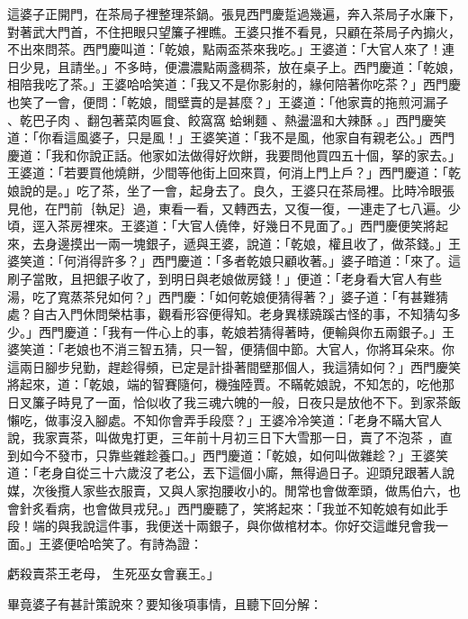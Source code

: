 這婆子正開門，在茶局子裡整理茶鍋。張見西門慶踅過幾遍，奔入茶局子水廉下，對著武大門首，不住把眼只望簾子裡瞧。王婆只推不看見，只顧在茶局子內搧火，不出來問茶。西門慶叫道：「乾娘，點兩盃茶來我吃。」王婆道：「大官人來了！連日少見，且請坐。」不多時，便濃濃點兩盞稠茶，放在桌子上。西門慶道：「乾娘，相陪我吃了茶。」王婆哈哈笑道：「我又不是你影射的，緣何陪著你吃茶？」西門慶也笑了一會，便問：「乾娘，間壁賣的是甚麼？」王婆道：「他家賣的拖煎河漏子 、乾巴子肉 、翻包著菜肉匾食、餃窩窩 蛤蜊麵 、熱盪溫和大辣酥 。」西門慶笑道：「你看這風婆子，只是風！」王婆笑道：「我不是風，他家自有親老公。」西門慶道：「我和你說正話。他家如法做得好炊餅，我要問他買四五十個，拏的家去。」王婆道：「若要買他燒餅，少間等他街上回來買，何消上門上戶？」西門慶道：「乾娘說的是。」吃了茶，坐了一會，起身去了。良久，王婆只在茶局裡。比時冷眼張見他，在門前｛執足｝過，東看一看，又轉西去，又復一復，一連走了七八遍。少頃，逕入茶房裡來。王婆道：「大官人僥倖，好幾日不見面了。」西門慶便笑將起來，去身邊摸出一兩一塊銀子，遞與王婆，說道：「乾娘，權且收了，做茶錢。」王婆笑道：「何消得許多？」西門慶道：「多者乾娘只顧收著。」婆子暗道：「來了。這刷子當敗，且把銀子收了，到明日與老娘做房錢！」便道：「老身看大官人有些湯，吃了寬蒸茶兒如何？」西門慶：「如何乾娘便猜得著？」婆子道：「有甚難猜處？自古入門休問榮枯事，觀看形容便得知。老身異樣蹺蹊古怪的事，不知猜勾多少。」西門慶道：「我有一件心上的事，乾娘若猜得著時，便輸與你五兩銀子。」王婆笑道：「老娘也不消三智五猜，只一智，便猜個中節。大官人，你將耳朵來。你這兩日腳步兒勤，趕趁得頻，已定是計掛著間壁那個人，我這猜如何？」西門慶笑將起來，道：「乾娘，端的智賽隨何，機強陸賈。不瞞乾娘說，不知怎的，吃他那日叉簾子時見了一面，恰似收了我三魂六魄的一般，日夜只是放他不下。到家茶飯懶吃，做事沒入腳處。不知你會弄手段麼？」王婆冷冷笑道：「老身不瞞大官人說，我家賣茶，叫做鬼打更，三年前十月初三日下大雪那一日，賣了不泡茶 ，直到如今不發市，只靠些雜趁養口。」西門慶道：「乾娘，如何叫做雜趁？」王婆笑道：「老身自從三十六歲沒了老公，丟下這個小廝，無得過日子。迎頭兒跟著人說媒，次後攬人家些衣服賣，又與人家抱腰收小的。閒常也會做牽頭，做馬伯六，也會針炙看病，也會做貝戎兒。」西門慶聽了，笑將起來：「我並不知乾娘有如此手段！端的與我說這件事，我便送十兩銀子，與你做棺材本。你好交這雌兒會我一面。」王婆便哈哈笑了。有詩為證：

虧殺賣茶王老母，  生死巫女會襄王。」

畢竟婆子有甚計策說來？要知後項事情，且聽下回分解：





